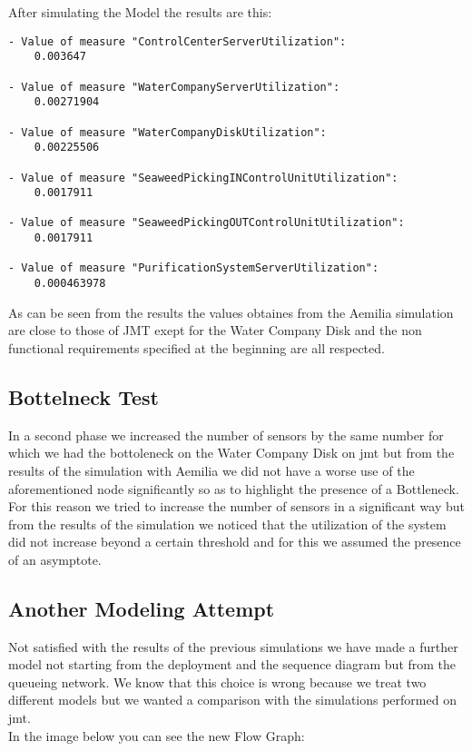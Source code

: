 After simulating the Model the results are this:

\lstset {language = C}
\bigskip
\begin{lstlisting}
- Value of measure "ControlCenterServerUtilization":
	0.003647

- Value of measure "WaterCompanyServerUtilization":
	0.00271904

- Value of measure "WaterCompanyDiskUtilization":
	0.00225506

- Value of measure "SeaweedPickingINControlUnitUtilization":
	0.0017911

- Value of measure "SeaweedPickingOUTControlUnitUtilization":
	0.0017911

- Value of measure "PurificationSystemServerUtilization":
	0.000463978
\end{lstlisting}

As can be seen from the results the values obtaines from the Aemilia simulation are close to those of JMT  exept for the Water Company Disk and the non functional requirements specified at the beginning are all respected.\\

\subsection{Bottelneck Test}

In a second phase we increased the number of sensors by the same number for which we had the bottoleneck on the Water Company Disk on jmt but from the results of the simulation with Aemilia we did not have a worse use of the aforementioned node significantly so as to highlight the presence of a Bottleneck.\\
For this reason we tried to increase the number of sensors in a significant way but from the results of the simulation we noticed that the utilization of the system did not increase beyond a certain threshold and for this we assumed the presence of an asymptote.

\subsection{Another Modeling Attempt}


Not satisfied with the results of the previous simulations we have made a further model not starting from the deployment and the sequence diagram but from the queueing network. We know that this choice is wrong because we treat two different models but we wanted a comparison with the simulations performed on jmt.\\
In the image below you can see the new Flow Graph:

